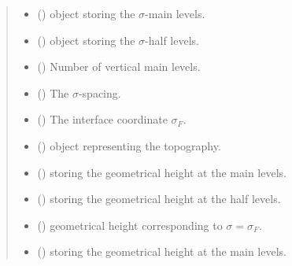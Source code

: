\documentclass[letterpaper,10pt,english]{sphinxmanual}
\begin{document}
\begin{fulllineitems}
\begin{quote}
\begin{description}
\begin{itemize}
\item {} 
 () \textendash{} {\hyperref[\detokenize{api:grids.axis.Axis}]{}} object storing the \(\sigma\)-main levels.

\item {} 
 () \textendash{} {\hyperref[\detokenize{api:grids.axis.Axis}]{}} object storing the \(\sigma\)-half levels.

\item {} 
 () \textendash{} Number of vertical main levels.

\item {} 
 () \textendash{} The \(\sigma\)-spacing.

\item {} 
 () \textendash{} The interface coordinate \(\sigma_F\).

\item {} 
{\hyperref[\detokenize{api:module-grids.topography}]{}} () \textendash{} {\hyperref[\detokenize{api:grids.topography.Topography1d}]{}} object representing
the topography.

\item {} 
 () \textendash{}  storing the geometrical height at
the main levels.

\item {} 
 () \textendash{}  storing the geometrical height at
the half levels.

\item {} 
 () \textendash{} geometrical height corresponding to \(\sigma = \sigma_F\).

\item {} 
 () \textendash{}  storing the geometrical height at
the main levels.


\end{itemize}
\end{description}
\end{quote}
\end{fulllineitems}
\end{document}
